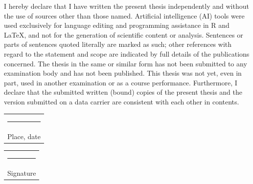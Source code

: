 I hereby declare that I have written the present thesis independently and without the use of sources other than those named. Artificial intelligence (AI) tools were used exclusively for language editing and programming assistance in R and \LaTeX, and not for the generation of scientific content or analysis. Sentences or parts of sentences quoted literally are marked as such; other references with regard to the statement and scope are indicated by full details of the publications concerned. The thesis in the same or similar form has not been submitted to any examination body and has not been published. This thesis was not yet, even in part, used in another examination or as a course performance. Furthermore, I declare that the submitted written (bound) copies of the present thesis and the version submitted on a data carrier are consistent with each other in contents. \\



\vspace*{4em}\noindent
\hfill%
\begin{tabular}[t]{c}
  \rule{10em}{0.4pt}\\ Place, date
\end{tabular}%
\hfill%
\begin{tabular}[t]{c}
  \rule{10em}{0.4pt}\\Signature
\end{tabular}%
\hfill\strut